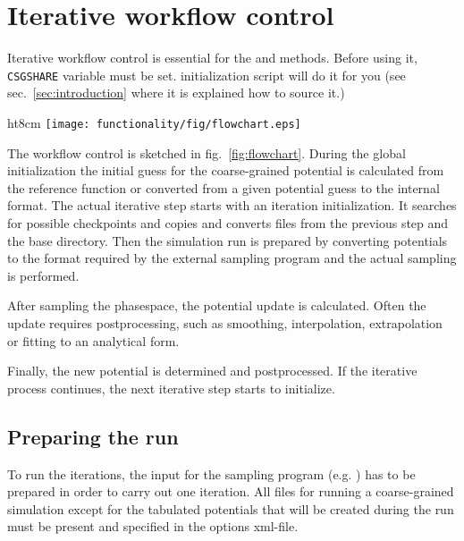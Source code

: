 \chapter{Iterative workflow control}
\label{sec:iterative_workflow}
Iterative workflow control is essential for the \ibi and \imc methods. Before using it, \texttt{CSGSHARE} variable must be set. \votca initialization script will do it for you (see sec.~\ref{sec:introduction} where it is explained how to source it.)

\begin{wrapfigure}{ht}{8cm}  
\texttt{[image: functionality/fig/flowchart.eps]}
  \caption{
    \label{fig:flowchart}
    Block-scheme of the workflow control for the iterative methods. The most time-consuming parts are marked in red.
  }
\end{wrapfigure}

The workflow control is sketched in fig.~\ref{fig:flowchart}. During the global initialization the initial guess for the coarse-grained potential is calculated from the reference function or converted from a given potential guess to the internal format. The actual iterative step starts with an iteration initialization. It searches for possible checkpoints and copies and converts files from the previous step and the base directory. Then the simulation run is prepared by converting potentials to the format required by the external sampling program and the actual sampling is performed. 

After sampling the phasespace, the potential update is calculated. Often the update requires postprocessing, such as smoothing, interpolation, extrapolation or fitting to an analytical form. 

Finally, the new potential is determined and postprocessed. If the iterative process continues, the next iterative step starts to initialize.

\section{Preparing the run}
To run the iterations, the input for the sampling program (e.g. \gromacs ) has to be prepared in order to carry out one iteration. All files for running a coarse-grained simulation except for the tabulated potentials that will be created during the run must be present and specified in the options xml-file.

